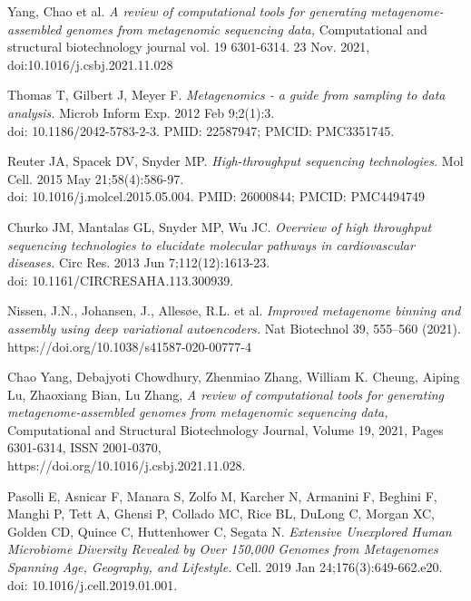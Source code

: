 \documentclass[a4paper,titlepage]{book}
\begin{document}
\begin{thebibliography}{}
Yang, Chao et al. \emph{A review of computational tools for generating metagenome-assembled genomes from metagenomic sequencing data,} Computational and structural biotechnology journal vol. 19 6301-6314. 23 Nov. 2021, \\doi:10.1016/j.csbj.2021.11.028

Thomas T, Gilbert J, Meyer F.
\emph{Metagenomics - a guide from sampling to data analysis.} Microb Inform Exp. 2012 Feb 9;2(1):3. \\doi: 10.1186/2042-5783-2-3. PMID: 22587947; PMCID: PMC3351745.


Reuter JA, Spacek DV, Snyder MP. \emph{High-throughput sequencing technologies.} Mol Cell. 2015 May 21;58(4):586-97.\\ doi: 10.1016/j.molcel.2015.05.004. PMID: 26000844; PMCID: PMC4494749


Churko JM, Mantalas GL, Snyder MP, Wu JC. \emph{Overview of high throughput sequencing technologies to elucidate molecular pathways in cardiovascular diseases.} Circ Res. 2013 Jun 7;112(12):1613-23. \\ doi: 10.1161/CIRCRESAHA.113.300939.

Nissen, J.N., Johansen, J., Allesøe, R.L. et al. \emph{Improved metagenome binning and assembly using deep variational autoencoders.} Nat Biotechnol 39, 555–560 (2021).\\https://doi.org/10.1038/s41587-020-00777-4


Chao Yang, Debajyoti Chowdhury, Zhenmiao Zhang, William K. Cheung, Aiping Lu, Zhaoxiang Bian, Lu Zhang,
\emph{A review of computational tools for generating metagenome-assembled genomes from metagenomic sequencing data,} Computational and Structural Biotechnology Journal, Volume 19, 2021, Pages 6301-6314, ISSN 2001-0370, \\https://doi.org/10.1016/j.csbj.2021.11.028.

Pasolli E, Asnicar F, Manara S, Zolfo M, Karcher N, Armanini F, Beghini F, Manghi P, Tett A, Ghensi P, Collado MC, Rice BL, DuLong C, Morgan XC, Golden CD, Quince C, Huttenhower C, Segata N. \emph{Extensive Unexplored Human Microbiome Diversity Revealed by Over 150,000 Genomes from Metagenomes Spanning Age, Geography, and Lifestyle.} Cell. 2019 Jan 24;176(3):649-662.e20. \\doi: 10.1016/j.cell.2019.01.001.


\end{thebibliography}
\end{document}
